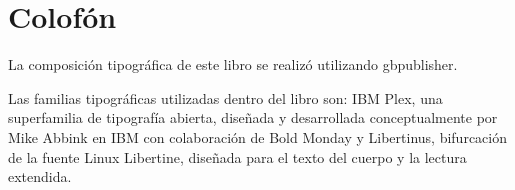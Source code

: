 \chapter*{Colofón}
\justifying
La composición tipográfica de este libro se realizó utilizando gbpublisher.

Las familias tipográficas utilizadas dentro del libro son: IBM Plex, una superfamilia de tipografía abierta, diseñada y desarrollada conceptualmente por Mike Abbink en IBM con colaboración de Bold Monday y Libertinus, bifurcación de la fuente Linux Libertine, diseñada para el texto del cuerpo y la lectura extendida.
